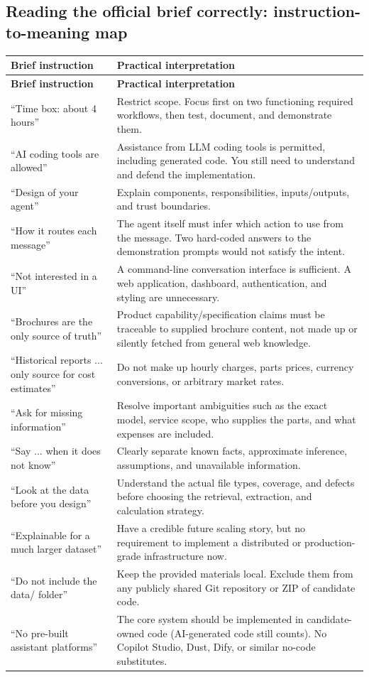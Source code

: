 \documentclass[11pt,a4paper]{article}
\begin{document}
\subsection{Reading the official brief correctly: instruction-to-meaning map}
\begin{longtable}{@{}L{51mm}L{97mm}@{}}
\toprule
\textbf{Brief instruction} & \textbf{Practical interpretation}\\\midrule\endfirsthead
\toprule\textbf{Brief instruction} & \textbf{Practical interpretation}\\\midrule\endhead
``Time box: about 4 hours'' & Restrict scope. Focus first on two functioning required workflows, then test, document, and demonstrate them.\\
``AI coding tools are allowed'' & Assistance from LLM coding tools is permitted, including generated code. You still need to understand and defend the implementation.\\
``Design of your agent'' & Explain components, responsibilities, inputs/outputs, and trust boundaries.\\
``How it routes each message'' & The agent itself must infer which action to use from the message. Two hard-coded answers to the demonstration prompts would not satisfy the intent.\\
``Not interested in a UI'' & A command-line conversation interface is sufficient. A web application, dashboard, authentication, and styling are unnecessary.\\
``Brochures are the only source of truth'' & Product capability/specification claims must be traceable to supplied brochure content, not made up or silently fetched from general web knowledge.\\
``Historical reports ... only source for cost estimates'' & Do not make up hourly charges, parts prices, currency conversions, or arbitrary market rates.\\
``Ask for missing information'' & Resolve important ambiguities such as the exact model, service scope, who supplies the parts, and what expenses are included.\\
``Say ... when it does not know'' & Clearly separate known facts, approximate inference, assumptions, and unavailable information.\\
``Look at the data before you design'' & Understand the actual file types, coverage, and defects before choosing the retrieval, extraction, and calculation strategy.\\
``Explainable for a much larger dataset'' & Have a credible future scaling story, but no requirement to implement a distributed or production-grade infrastructure now.\\
``Do not include the data/ folder'' & Keep the provided materials local. Exclude them from any publicly shared Git repository or ZIP of candidate code.\\
``No pre-built assistant platforms'' & The core system should be implemented in candidate-owned code (AI-generated code still counts). No Copilot Studio, Dust, Dify, or similar no-code substitutes.\\
\bottomrule
\end{longtable}
\end{document}
